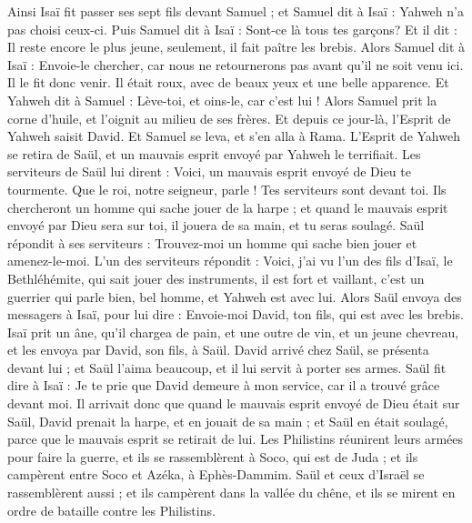 \begin{multicols}{2}
Ainsi Isaï fit passer ses sept fils devant Samuel ; et Samuel dit à Isaï : Yahweh n’a pas choisi ceux-ci.
Puis Samuel dit à Isaï : Sont-ce là tous tes garçons? Et il dit : Il reste encore le plus jeune, seulement, il fait paître les brebis. Alors Samuel dit à Isaï : Envoie-le chercher, car nous ne retournerons pas avant qu’il ne soit venu ici.
Il le fit donc venir. Il était roux, avec de beaux yeux et une belle apparence. Et Yahweh dit à Samuel : Lève-toi, et oins-le, car c'est lui !
Alors Samuel prit la corne d'huile, et l'oignit au milieu de ses frères. Et depuis ce jour-là, l'Esprit de Yahweh saisit David. Et Samuel se leva, et s'en alla à Rama.
L'Esprit de Yahweh se retira de Saül, et un mauvais esprit envoyé par Yahweh le terrifiait.
Les serviteurs de Saül lui dirent : Voici, un mauvais esprit envoyé de Dieu te tourmente.
Que le roi, notre seigneur, parle ! Tes serviteurs sont devant toi. Ils chercheront un homme qui sache jouer de la harpe ; et quand le mauvais esprit envoyé par Dieu sera sur toi, il jouera de sa main, et tu seras soulagé.
Saül répondit à ses serviteurs : Trouvez-moi un homme qui sache bien jouer et amenez-le-moi.
L'un des serviteurs répondit : Voici, j'ai vu l’un des fils d'Isaï, le Bethléhémite, qui sait jouer des instruments, il est fort et vaillant, c’est un guerrier qui parle bien, bel homme, et Yahweh est avec lui.
Alors Saül envoya des messagers à Isaï, pour lui dire : Envoie-moi David, ton fils, qui est avec les brebis.
Isaï prit un âne, qu’il chargea de pain, et une outre de vin, et un jeune chevreau, et les envoya par David, son fils, à Saül.
David arrivé chez Saül, se présenta devant lui ; et Saül l'aima beaucoup, et il lui servit à porter ses armes.
Saül fit dire à Isaï : Je te prie que David demeure à mon service, car il a trouvé grâce devant moi.
Il arrivait donc que quand le mauvais esprit envoyé de Dieu était sur Saül, David prenait la harpe, et en jouait de sa main ; et Saül en était soulagé, parce que le mauvais esprit se retirait de lui.
\VerseOne{}Les Philistins réunirent leurs armées pour faire la guerre, et ils se rassemblèrent à Soco, qui est de Juda ; et ils campèrent entre Soco et Azéka, à Ephès-Dammim.
Saül et ceux d'Israël se rassemblèrent aussi ; et ils campèrent dans la vallée du chêne, et ils se mirent en ordre de bataille contre les Philistins.

\end{multicols}
